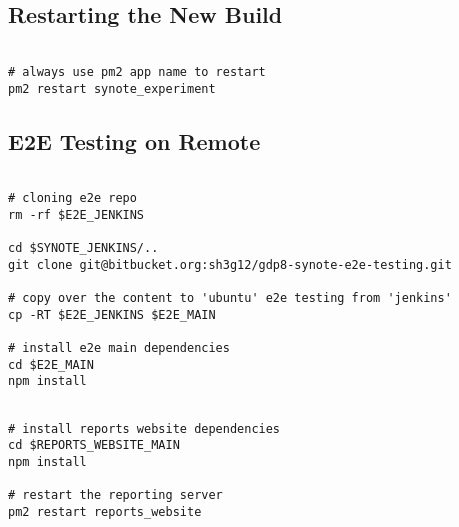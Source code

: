 \subsection{Restarting the New Build}
\label{subsec:restarting-the-new-build}

\begin{listing}[H]
\begin{verbatim}

# always use pm2 app name to restart
pm2 restart synote_experiment

\end{verbatim}
\label{lst:restart-experiment-deployment}
\end{listing}

\subsection{E2E Testing on Remote}
\label{subsec:e2e-testing-on-remote}

\begin{listing}[H]
\begin{verbatim}

# cloning e2e repo
rm -rf $E2E_JENKINS

cd $SYNOTE_JENKINS/..
git clone git@bitbucket.org:sh3g12/gdp8-synote-e2e-testing.git

# copy over the content to 'ubuntu' e2e testing from 'jenkins'
cp -RT $E2E_JENKINS $E2E_MAIN

# install e2e main dependencies
cd $E2E_MAIN
npm install

\end{verbatim}
\label{lst:configure-latest-e2e-testing-repo}
\end{listing}

\begin{listing}[H]
\begin{verbatim}

# install reports website dependencies
cd $REPORTS_WEBSITE_MAIN
npm install

# restart the reporting server
pm2 restart reports_website

\end{verbatim}
\label{lst:deploy-latest-reporting-website}
\end{listing}

